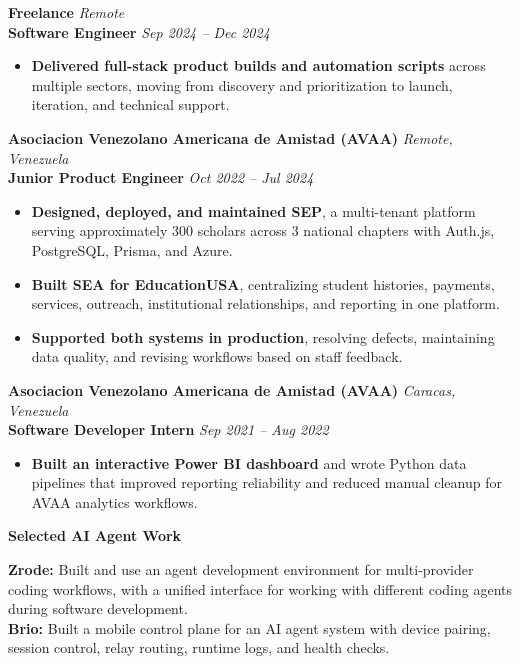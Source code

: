 \documentclass[11pt]{article}
\begin{document}
\newpage
\textbf{Freelance} \hfill \textit{Remote} \\
\textbf{Software Engineer} \hfill \textit{Sep 2024 -- Dec 2024}
\begin{itemize}
    \item \textbf{Delivered full-stack product builds and automation scripts} across multiple sectors, moving from discovery and prioritization to launch, iteration, and technical support.
\end{itemize}

\vspace{10pt}
\textbf{Asociacion Venezolano Americana de Amistad (AVAA)} \hfill \textit{Remote, Venezuela} \\
\textbf{Junior Product Engineer} \hfill \textit{Oct 2022 -- Jul 2024}
\begin{itemize}
    \item \textbf{Designed, deployed, and maintained SEP}, a multi-tenant platform serving approximately 300 scholars across 3 national chapters with Auth.js, PostgreSQL, Prisma, and Azure.
    \item \textbf{Built SEA for EducationUSA}, centralizing student histories, payments, services, outreach, institutional relationships, and reporting in one platform.
    \item \textbf{Supported both systems in production}, resolving defects, maintaining data quality, and revising workflows based on staff feedback.
\end{itemize}

\vspace{10pt}
\textbf{Asociacion Venezolano Americana de Amistad (AVAA)} \hfill \textit{Caracas, Venezuela} \\
\textbf{Software Developer Intern} \hfill \textit{Sep 2021 -- Aug 2022}
\begin{itemize}
    \item \textbf{Built an interactive Power BI dashboard} and wrote Python data pipelines that improved reporting reliability and reduced manual cleanup for AVAA analytics workflows.
\end{itemize}

\vspace{8pt}
\begin{center}
    \textbf{Selected AI Agent Work}
\end{center}
\vspace{-4pt}
\textbf{Zrode:} Built and use an agent development environment for multi-provider coding workflows, with a unified interface for working with different coding agents during software development. \\
\textbf{Brio:} Built a mobile control plane for an AI agent system with device pairing, session control, relay routing, runtime logs, and health checks.
\end{document}
